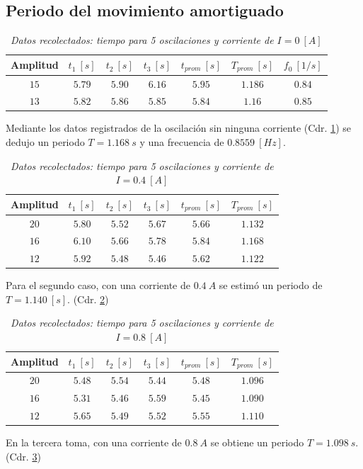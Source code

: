 \documentclass[spanish,notitlepage,letterpaper, 12pt]{article}
\begin{document}
\subsection{Periodo del movimiento amortiguado}
\begin{table}[ht]
    \centering
    \begin{tabular}{|c|c|c|c|c|c|c|}
        \hline
        \textbf{Amplitud} & $t_1 \ [s]$ & $t_2 \ [s]$ & $t_3\ [s]$ & $t_{prom}\ [s]$ & $T_{prom}\ [s]$ & $f_0\ [1/s]$\\
        \hline\hline
        $15$ & $5.79$ & $5.90$ & $6.16$ & $5.95$ & $1.186$ & $0.84$\\
        $13$ & $5.82$ & $5.86$ & $5.85$ & $5.84$ & $1.16$ & $0.85$\\
        \hline
    \end{tabular}
    \caption{\textit{Datos recolectados: tiempo para 5 oscilaciones y corriente de $I=0\ [A]$}}
    \label{Table 2}
\end{table}
Mediante los datos registrados de la oscilación sin ninguna corriente (Cdr. \ref{Table 2}) se dedujo un periodo $T=1.168\ s$ y una frecuencia de $0.8559\ [Hz]$.
\begin{table}[ht]
    \centering
    \begin{tabular}{|c|c|c|c|c|c|}
        \hline
        \textbf{Amplitud} & $t_1 \ [s]$ & $t_2 \ [s]$ & $t_3\ [s]$ & $t_{prom}\ [s]$ & $T_{prom}\ [s]$\\
        \hline\hline
        $20$ & $5.80$ & $5.52$ & $5.67$ & $5.66$ & $1.132$\\
        $16$ & $6.10$ & $5.66$ & $5.78$ & $5.84$ & $1.168$\\
        $12$ & $5.92$ & $5.48$ & $5.46$ & $5.62$ & $1.122$\\
        \hline
    \end{tabular}
    \caption{\textit{Datos recolectados: tiempo para 5 oscilaciones y corriente de $I=0.4\ [A]$}}
    \label{Table 3}
\end{table}
Para el segundo caso, con una corriente de $0.4\ A$ se estimó un periodo de $T=1.140\ [s]$. (Cdr. \ref{Table 3})
\newpage
\begin{table}[ht]
    \centering
    \begin{tabular}{|c|c|c|c|c|c|}
        \hline
        \textbf{Amplitud} & $t_1 \ [s]$ & $t_2 \ [s]$ & $t_3\ [s]$ & $t_{prom}\ [s]$ & $T_{prom}\ [s]$\\
        \hline\hline
        $20$ & $5.48$ & $5.54$ & $5.44$ & $5.48$ & $1.096$\\
        $16$ & $5.31$ & $5.46$ & $5.59$ & $5.45$ & $1.090$\\
        $12$ & $5.65$ & $5.49$ & $5.52$ & $5.55$ & $1.110$\\
        \hline
    \end{tabular}
    \caption{\textit{Datos recolectados: tiempo para 5 oscilaciones y corriente de $I=0.8\ [A]$}}
    \label{Table 4}
\end{table}
En la tercera toma, con una corriente de $0.8\ A$ se obtiene un periodo $T=1.098\ s$. (Cdr. \ref{Table 4})
\end{document}
